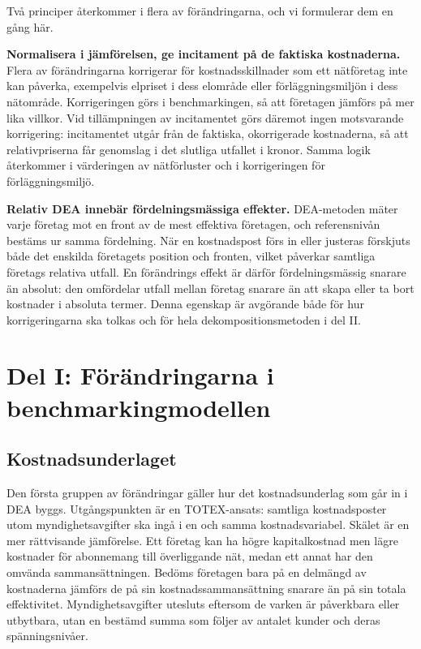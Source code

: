 \documentclass[11pt,a4paper]{article}
\begin{document}
Två principer återkommer i flera av förändringarna, och vi formulerar dem en gång här.

\textbf{Normalisera i jämförelsen, ge incitament på de faktiska kostnaderna.} Flera av
förändringarna korrigerar för kostnadsskillnader som ett nätföretag inte kan påverka, exempelvis
elpriset i dess elområde eller förläggningsmiljön i dess nätområde. Korrigeringen görs i
benchmarkingen, så att företagen jämförs på mer lika villkor. Vid tillämpningen av incitamentet
görs däremot ingen motsvarande korrigering: incitamentet utgår från de faktiska, okorrigerade
kostnaderna, så att relativpriserna får genomslag i det slutliga utfallet i kronor. Samma logik
återkommer i värderingen av nätförluster och i korrigeringen för förläggningsmiljö.

\textbf{Relativ DEA innebär fördelningsmässiga effekter.} DEA-metoden mäter varje företag mot en
front av de mest effektiva företagen, och referensnivån bestäms ur samma fördelning. När en
kostnadspost förs in eller justeras förskjuts både det enskilda företagets position och fronten,
vilket påverkar samtliga företags relativa utfall. En förändrings effekt är därför
fördelningsmässig snarare än absolut: den omfördelar utfall mellan företag snarare än att skapa
eller ta bort kostnader i absoluta termer. Denna egenskap är avgörande både för hur
korrigeringarna ska tolkas och för hela dekompositionsmetoden i del II.

\section{Del I: Förändringarna i benchmarkingmodellen}

\subsection{Kostnadsunderlaget}

Den första gruppen av förändringar gäller hur det kostnadsunderlag som går in i DEA byggs.
Utgångspunkten är en TOTEX-ansats: samtliga kostnadsposter utom myndighetsavgifter ska ingå i en
och samma kostnadsvariabel. Skälet är en mer rättvisande jämförelse. Ett företag kan ha högre
kapitalkostnad men lägre kostnader för abonnemang till överliggande nät, medan ett annat har den
omvända sammansättningen. Bedöms företagen bara på en delmängd av kostnaderna jämförs de på sin
kostnadssammansättning snarare än på sin totala effektivitet. Myndighetsavgifter utesluts eftersom
de varken är påverkbara eller utbytbara, utan en bestämd summa som följer av antalet kunder och
deras spänningsnivåer.
\end{document}
